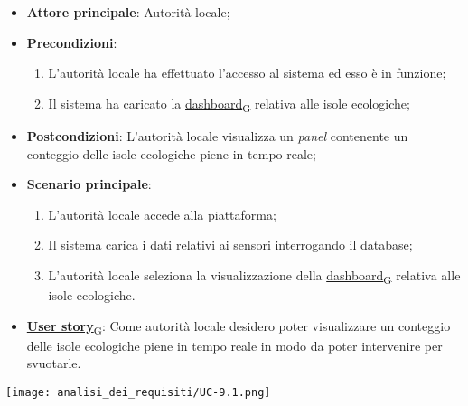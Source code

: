\begin{itemize}
	\item \textbf{Attore principale}: Autorità locale;
	\item \textbf{Precondizioni}:
	      \begin{enumerate}
		      \item L'autorità locale ha effettuato l'accesso al sistema ed esso è in funzione;
		      \item Il sistema ha caricato la \href{https://7last.github.io/docs/rtb/documentazione-interna/glossario\#dashboard}{dashboard\textsubscript{G}} relativa alle isole ecologiche;
	      \end{enumerate}
	\item \textbf{Postcondizioni}: L'autorità locale visualizza un \textit{panel} contenente un conteggio delle isole ecologiche piene in tempo reale;
	\item \textbf{Scenario principale}:
	      \begin{enumerate}
		      \item L'autorità locale accede alla piattaforma;
		      \item Il sistema carica i dati relativi ai sensori interrogando il database;
		      \item L'autorità locale seleziona la visualizzazione della \href{https://7last.github.io/docs/rtb/documentazione-interna/glossario\#dashboard}{dashboard\textsubscript{G}} relativa alle isole ecologiche.
	      \end{enumerate}
	\item \href{https://7last.github.io/docs/rtb/documentazione-interna/glossario\#user-story}{\textbf{User story}\textsubscript{G}}:
	      Come autorità locale desidero poter visualizzare un conteggio delle isole ecologiche piene in tempo reale in modo da poter intervenire
	      per svuotarle.
\end{itemize}
\begin{center}
	\texttt{[image: analisi\_dei\_requisiti/UC-9.1.png]}
\end{center}

